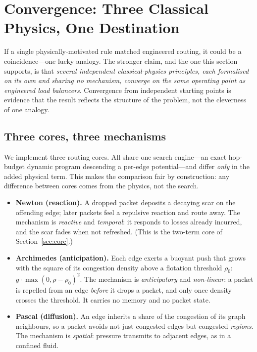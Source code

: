 \section{Convergence: Three Classical Physics, One Destination}
\label{sec:convergence}

If a single physically-motivated rule matched engineered routing, it could be a
coincidence---one lucky analogy. The stronger claim, and the one this section
supports, is that \emph{several independent classical-physics principles, each
formalised on its own and sharing no mechanism, converge on the same operating
point as engineered load balancers}. Convergence from independent starting
points is evidence that the result reflects the structure of the problem, not
the cleverness of one analogy.

\subsection{Three cores, three mechanisms}

We implement three routing cores. All share one search engine---an exact
hop-budget dynamic program descending a per-edge potential---and differ
\emph{only} in the added physical term. This makes the comparison fair by
construction: any difference between cores comes from the physics, not the
search.

\begin{itemize}
\item \textbf{Newton (reaction).} A dropped packet deposits a decaying scar on
the offending edge; later packets feel a repulsive reaction and route away. The
mechanism is \emph{reactive} and \emph{temporal}: it responds to losses already
incurred, and the scar fades when not refreshed. (This is the two-term core of
Section~\ref{sec:core}.)

\item \textbf{Archimedes (anticipation).} Each edge exerts a buoyant push that
grows with the square of its congestion density above a flotation threshold
$\rho_0$: $g\cdot\max(0,\rho-\rho_0)^2$. The mechanism is \emph{anticipatory}
and \emph{non-linear}: a packet is repelled from an edge \emph{before} it drops
a packet, and only once density crosses the threshold. It carries no memory and
no packet state.

\item \textbf{Pascal (diffusion).} An edge inherits a share of the congestion of
its graph neighbours, so a packet avoids not just congested edges but congested
\emph{regions}. The mechanism is \emph{spatial}: pressure transmits to adjacent
edges, as in a confined fluid.
\end{itemize}

